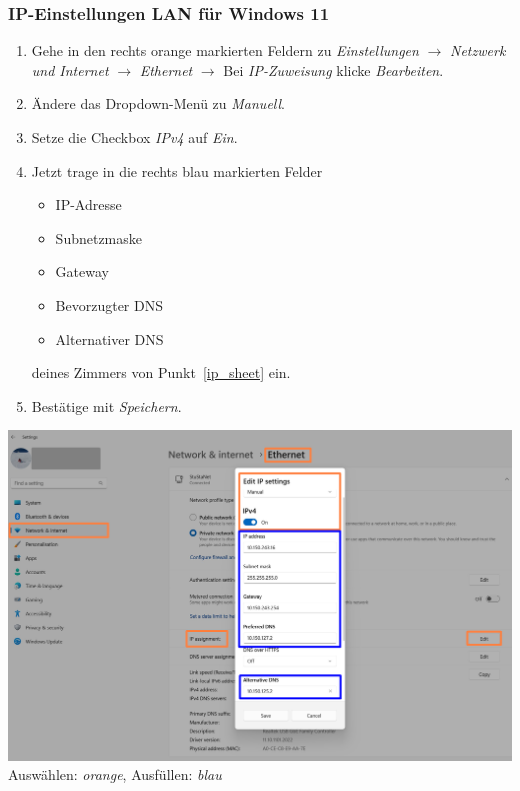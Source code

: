 \documentclass[a4paper,12pt]{scrartcl}
\begin{document}
\subsubsection*{IP-Einstellungen LAN für Windows 11}
\begin{minipage}{0.57\textwidth}
\begin{enumerate}
	\item Gehe in den rechts orange markierten Feldern zu \textit{Einstellungen} $\rightarrow$ \textit{Netzwerk und Internet} $\rightarrow$ \textit{Ethernet} $\rightarrow$ Bei \textit{IP-Zuweisung} klicke \textit{Bearbeiten}.
	\item Ändere das Dropdown-Menü zu \textit{Manuell}.
	\item Setze die Checkbox \textit{IPv4} auf \textit{Ein}.
	\item Jetzt trage in die rechts blau markierten Felder
		\begin{itemize}
			\item IP-Adresse
			\item Subnetzmaske
			\item Gateway
			\item Bevorzugter DNS
			\item Alternativer DNS
		\end{itemize}
	deines Zimmers von Punkt~\ref{ip_sheet} ein.
	\item Bestätige mit \textit{Speichern}.
\end{enumerate}
\end{minipage}
\hfill
\begin{minipage}{0.4\textwidth}
\includegraphics[width=\linewidth]{Bilder/Win11/IP_win11}
Auswählen: \textit{orange}, Ausfüllen: \textit{blau}
\end{minipage}
\end{document}
